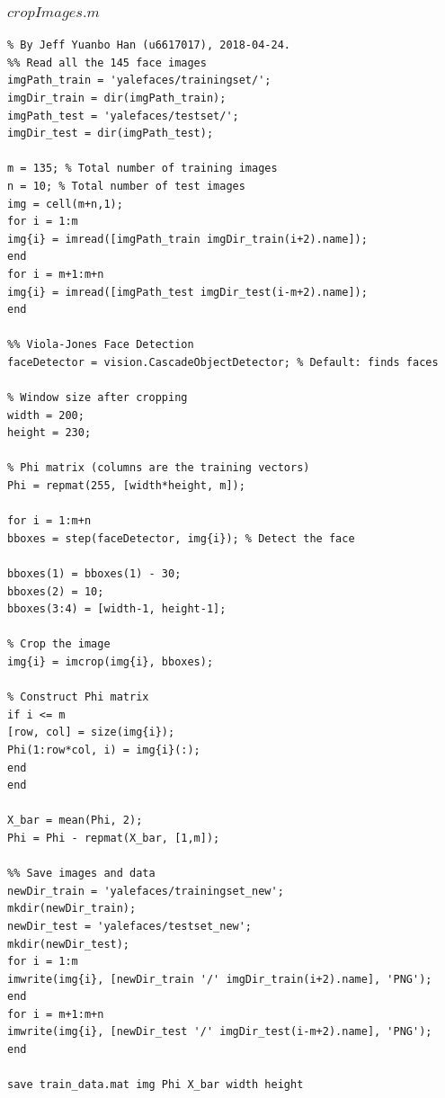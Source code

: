 \documentclass{article}
\theoremstyle{plain} \newtheorem{prop}{Proposition}
\begin{document}
\subsubsection{$cropImages.m$}
\label{code-1}
\begin{lstlisting}
% By Jeff Yuanbo Han (u6617017), 2018-04-24.
%% Read all the 145 face images
imgPath_train = 'yalefaces/trainingset/';
imgDir_train = dir(imgPath_train);
imgPath_test = 'yalefaces/testset/';
imgDir_test = dir(imgPath_test);

m = 135; % Total number of training images
n = 10; % Total number of test images
img = cell(m+n,1);
for i = 1:m
img{i} = imread([imgPath_train imgDir_train(i+2).name]);
end
for i = m+1:m+n
img{i} = imread([imgPath_test imgDir_test(i-m+2).name]);
end

%% Viola-Jones Face Detection
faceDetector = vision.CascadeObjectDetector; % Default: finds faces

% Window size after cropping
width = 200;
height = 230;

% Phi matrix (columns are the training vectors)
Phi = repmat(255, [width*height, m]);

for i = 1:m+n
bboxes = step(faceDetector, img{i}); % Detect the face

bboxes(1) = bboxes(1) - 30;
bboxes(2) = 10;
bboxes(3:4) = [width-1, height-1];

% Crop the image
img{i} = imcrop(img{i}, bboxes);

% Construct Phi matrix
if i <= m
[row, col] = size(img{i});
Phi(1:row*col, i) = img{i}(:);
end
end

X_bar = mean(Phi, 2);
Phi = Phi - repmat(X_bar, [1,m]);

%% Save images and data
newDir_train = 'yalefaces/trainingset_new';
mkdir(newDir_train);
newDir_test = 'yalefaces/testset_new';
mkdir(newDir_test);
for i = 1:m
imwrite(img{i}, [newDir_train '/' imgDir_train(i+2).name], 'PNG');
end
for i = m+1:m+n
imwrite(img{i}, [newDir_test '/' imgDir_test(i-m+2).name], 'PNG');
end

save train_data.mat img Phi X_bar width height

\end{lstlisting}
\end{document}
